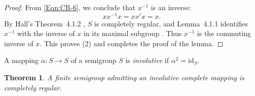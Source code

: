 \documentclass[11pt]{article}
\theoremstyle{plain}
\newtheorem{theorem}{Theorem}[section]
\theoremstyle{remark}
\theoremstyle{definition}
\theoremstyle{plain}
\newcommand{\idmap}{\mathrm{id}}
\newcommand{\inv}{^{-1}}
\begin{document}
\begin{proof}
From \eqref{Eqn:CR-6}, we conclude that $x\inv$ is an inverse:
\begin{equation}\label{Eqn:CR-inn}
xx\inv x = xx'x = x.
\end{equation}
{By Hall's Theorem~4.1.2  \cite{Hall89}, $S$ is completely regular, and Lemma~4.1.1 identifies $x\inv$ with the inverse of $x$ in its maximal subgroup \cite[Lemma~4.1.1 and Theorem~4.1.2]{Hall89}. Thus $x\inv$ is the commuting inverse of $x$.}
This proves (2) and completes the proof of the lemma.
\end{proof}

A mapping $\alpha\colon S\to S$ of a semigroup $S$ is \emph{involutive} if $\alpha^2 = \idmap_S$.

\begin{theorem}\label{Thm:involution}
A finite semigroup admitting an involutive complete mapping is completely regular.
\end{theorem}
\end{document}
